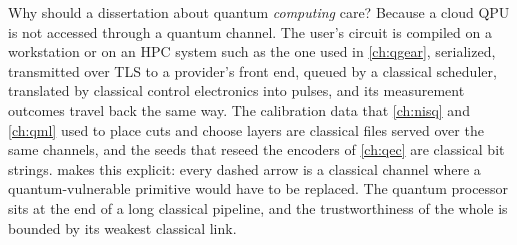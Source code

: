 Why should a dissertation about quantum \emph{computing} care? Because a cloud QPU is not accessed through a quantum channel. The user's circuit is compiled on a workstation or on an HPC system such as the one used in \cref{ch:qgear}, serialized, transmitted over TLS to a provider's front end, queued by a classical scheduler, translated by classical control electronics into pulses, and its measurement outcomes travel back the same way. The calibration data that \cref{ch:nisq} and \cref{ch:qml} used to place cuts and choose layers are classical files served over the same channels, and the seeds that reseed the encoders of \cref{ch:qec} are classical bit strings.  makes this explicit: every dashed arrow is a classical channel where a quantum-vulnerable primitive would have to be replaced. The quantum processor sits at the end of a long classical pipeline, and the trustworthiness of the whole is bounded by its weakest classical link.

